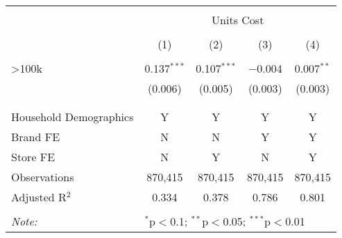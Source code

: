 
\begin{table}[!htbp] \centering 
  \caption{} 
  \label{} 
\begin{tabular}{@{\extracolsep{5pt}}lcccc} 
\\[-1.8ex]\hline 
\hline \\[-1.8ex] 
 & \multicolumn{4}{c}{Units Cost} \\ 
\cline{2-5} 
\\[-1.8ex] & (1) & (2) & (3) & (4)\\ 
\hline \\[-1.8ex] 
 >100k & 0.137$^{***}$ & 0.107$^{***}$ & $-$0.004 & 0.007$^{**}$ \\ 
  & (0.006) & (0.005) & (0.003) & (0.003) \\ 
  & & & & \\ 
\hline \\[-1.8ex] 
Household Demographics & Y & Y & Y & Y \\ 
Brand FE & N & N & Y & Y \\ 
Store FE & N & Y & N & Y \\ 
Observations & 870,415 & 870,415 & 870,415 & 870,415 \\ 
Adjusted R$^{2}$ & 0.334 & 0.378 & 0.786 & 0.801 \\ 
\hline 
\hline \\[-1.8ex] 
\textit{Note:}  & \multicolumn{4}{l}{$^{*}$p$<$0.1; $^{**}$p$<$0.05; $^{***}$p$<$0.01} \\ 
\end{tabular} 
\end{table} 
